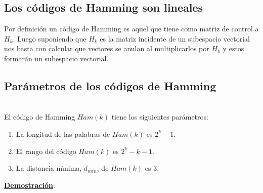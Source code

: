 \subsection{Los c\'odigos de Hamming son lineales}

Por definici\'on un c\'odigo de Hamming es aquel que tiene como matriz de
control a $H_k$. Luego suponiendo que $H_k$ es la matriz incidente de un
subespacio vectorial nos basta con calcular que vectores se anulan al
multiplicarlos por $H_k$ y estos formar\'an un subespacio vectorial.

\subsection{Par\'ametros de los c\'odigos de Hamming}

\begin{proposicion}
\ \\
El c\'odigo de Hamming $Ham(k)$ tiene los siguientes par\'ametros:
\begin{enumerate}
\item La longitud de las palabras de $Ham(k)$ es $2^k-1$.
\item El rango del c\'odigo $Ham(k)$ es $2^k-k-1$.
\item La distancia m\'{\i}nima, $d_{min}$, de $Ham(k)$ es $3$.
\end{enumerate}
\end{proposicion}
\underline{\textbf{Demostraci\'on}}:\\
